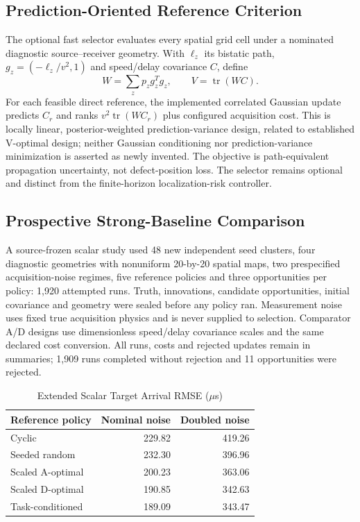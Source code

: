 \subsection{Prediction-Oriented Reference Criterion}
The optional fast selector evaluates every spatial grid cell under a nominated diagnostic source--receiver geometry. With $\ell_z$ its bistatic path, $g_z=(-\ell_z/v^2,1)$ and speed/delay covariance $C$, define
\begin{equation}
 W=\sum_zp_zg_z^Tg_z, \qquad V=\operatorname{tr}(WC).
\end{equation}
For each feasible direct reference, the implemented correlated Gaussian update predicts $C_r$ and ranks $v^2\operatorname{tr}(WC_r)$ plus configured acquisition cost. This is locally linear, posterior-weighted prediction-variance design, related to established V-optimal design; neither Gaussian conditioning nor prediction-variance minimization is asserted as newly invented. The objective is path-equivalent propagation uncertainty, not defect-position loss. The selector remains optional and distinct from the finite-horizon localization-risk controller.

\subsection{Prospective Strong-Baseline Comparison}
A source-frozen scalar study used 48 new independent seed clusters, four diagnostic geometries with nonuniform 20-by-20 spatial maps, two prespecified acquisition-noise regimes, five reference policies and three opportunities per policy: 1,920 attempted runs. Truth, innovations, candidate opportunities, initial covariance and geometry were sealed before any policy ran. Measurement noise uses fixed true acquisition physics and is never supplied to selection. Comparator A/D designs use dimensionless speed/delay covariance scales and the same declared cost conversion. All runs, costs and rejected updates remain in summaries; 1,909 runs completed without rejection and 11 opportunities were rejected.

\begin{table}[t]
\caption{Extended Scalar Target Arrival RMSE ($\mu$s)}
\label{tab:extended-reference}
\centering\small
\begin{tabular}{@{}lrr@{}}
\toprule
Reference policy & Nominal noise & Doubled noise\\
\midrule
Cyclic & 229.82 & 419.26\\
Seeded random & 232.30 & 396.96\\
Scaled A-optimal & 200.23 & 363.06\\
Scaled D-optimal & 190.85 & 342.63\\
Task-conditioned & 189.09 & 343.47\\
\bottomrule
\end{tabular}
\end{table}

